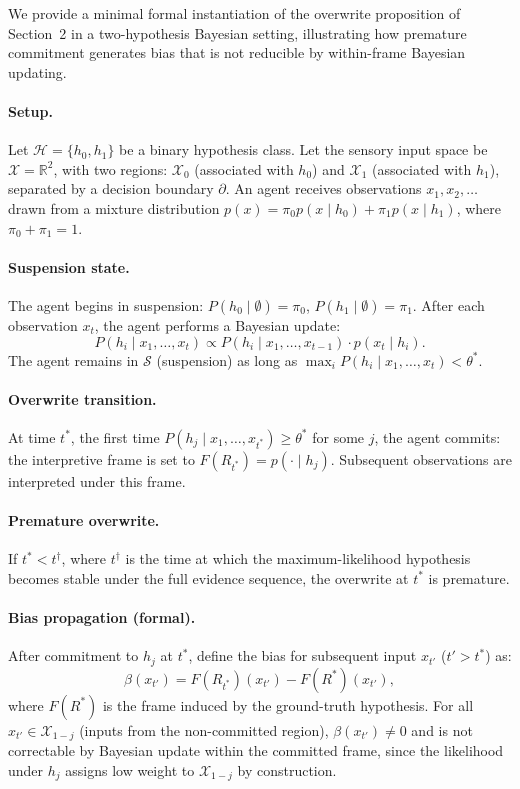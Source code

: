 \documentclass[12pt]{article}
\begin{document}
We provide a minimal formal instantiation of the overwrite proposition of
Section~2 in a two-hypothesis Bayesian setting, illustrating how premature
commitment generates bias that is not reducible by within-frame Bayesian
updating.

\paragraph{Setup.}
Let $\mathcal{H} = \{h_0, h_1\}$ be a binary hypothesis class.
Let the sensory input space be $\mathcal{X} = \mathbb{R}^2$, with two
regions: $\mathcal{X}_0$ (associated with $h_0$) and
$\mathcal{X}_1$ (associated with $h_1$), separated by a decision
boundary $\partial$.
An agent receives observations $x_1, x_2, \ldots$ drawn from a
mixture distribution $p(x) = \pi_0 p(x \mid h_0) + \pi_1 p(x \mid h_1)$,
where $\pi_0 + \pi_1 = 1$.

\paragraph{Suspension state.}
The agent begins in suspension: $P(h_0 \mid \emptyset) = \pi_0$,
$P(h_1 \mid \emptyset) = \pi_1$.
After each observation $x_t$, the agent performs a Bayesian update:
\[
P(h_i \mid x_1, \ldots, x_t) \propto P(h_i \mid x_1, \ldots, x_{t-1}) \cdot p(x_t \mid h_i).
\]
The agent remains in $\mathcal{S}$ (suspension) as long as
$\max_i P(h_i \mid x_1, \ldots, x_t) < \theta^*$.

\paragraph{Overwrite transition.}
At time $t^*$, the first time $P(h_j \mid x_1, \ldots, x_{t^*}) \geq \theta^*$
for some $j$, the agent commits: the interpretive frame is set to
$F(R_{t^*}) = p(\cdot \mid h_j)$. Subsequent observations are
interpreted under this frame.

\paragraph{Premature overwrite.}
If $t^* < t^\dagger$, where $t^\dagger$ is the time at which the
maximum-likelihood hypothesis becomes stable under the full evidence
sequence, the overwrite at $t^*$ is premature.

\paragraph{Bias propagation (formal).}
After commitment to $h_j$ at $t^*$, define the bias for subsequent
input $x_{t'}$ ($t' > t^*$) as:
\[
\beta(x_{t'}) = F(R_{t^*})(x_{t'}) - F(R^*)(x_{t'}),
\]
where $F(R^*)$ is the frame induced by the ground-truth hypothesis.
For all $x_{t'} \in \mathcal{X}_{1-j}$ (inputs from the non-committed
region), $\beta(x_{t'}) \neq 0$ and is not correctable by Bayesian
update within the committed frame, since the likelihood under $h_j$
assigns low weight to $\mathcal{X}_{1-j}$ by construction.
\end{document}
